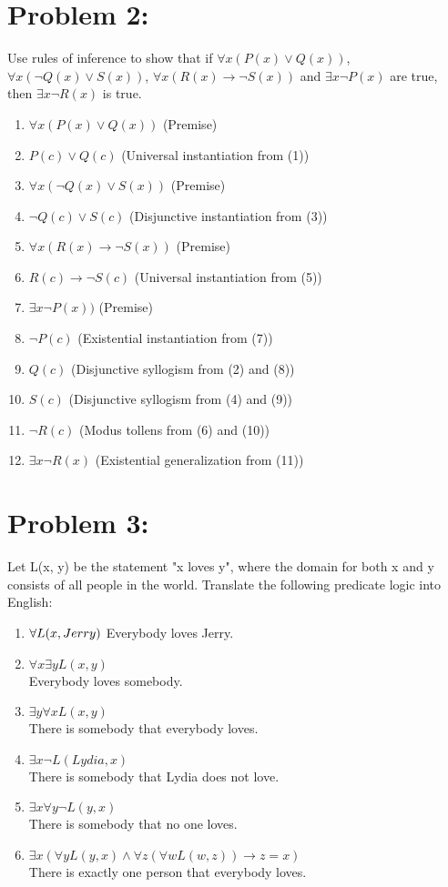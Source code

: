 \documentclass[12pt,en,a4paper]{report}
\begin{document}
	\section*{Problem 2:}
	Use rules of inference to show that if $\forall x (P(x) \vee Q(x))$, $\forall x (\neg Q(x) \vee S(x))$, $\forall x (R(x) \rightarrow \neg S(x))$ and $\exists x \neg P(x)$ are true, then $\exists x \neg R(x)$ is true.\\
	\begin{enumerate}
		\item $\forall x (P(x) \vee Q(x))$ (Premise)
		\item $P(c) \vee Q(c)$ (Universal instantiation from (1))
		\item $\forall x (\neg Q(x) \vee S(x))$ (Premise)
		\item $\neg Q(c) \vee S(c)$ (Disjunctive instantiation from (3))
		\item $\forall x (R(x) \rightarrow \neg S(x))$ (Premise)
		\item $R(c) \rightarrow \neg S(c)$ (Universal instantiation from (5))
		\item $\exists x \neg P(x))$ (Premise)
		\item $\neg P(c)$ (Existential instantiation from (7))
		\item $Q(c)$ (Disjunctive syllogism from (2) and (8))
		\item $S(c)$ (Disjunctive syllogism from (4) and (9))
		\item $\neg R(c)$ (Modus tollens from (6) and (10))
		\item $\exists x \neg R(x)$ (Existential generalization from (11))
	\end{enumerate}
\newpage
{}
	\section*{Problem 3:}
	Let L(x, y) be the statement "x loves y", where the domain for both x and y consists of all people in the world. Translate the following predicate logic into English:
	\begin{enumerate}
		\item $\forall L(x, Jerry)\\$
		Everybody loves Jerry.
		\item $\forall x \exists y L(x, y)$\\
		Everybody loves somebody.
		\item $\exists y \forall x L(x, y)$\\
		There is somebody that everybody loves.
		\item $\exists x \neg L(Lydia, x)$\\
		There is somebody that Lydia does not love.
		\item $\exists x \forall y \neg L(y, x)$\\
		There is somebody that no one loves.
		\item $\exists x (\forall y L(y, x) \wedge \forall z (\forall w L(w, z)) \rightarrow z = x)$\\
		There is exactly one person that everybody loves.
	\end{enumerate}
\newpage
{}
\end{document}
